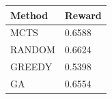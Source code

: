 \begin{tabular}{ll}
\hline
Method & Reward \\
\hline
  MCTS & 0.6588 \\
  RANDOM & 0.6624 \\
  GREEDY & 0.5398 \\
  GA & 0.6554 \\
\hline
\end{tabular}
